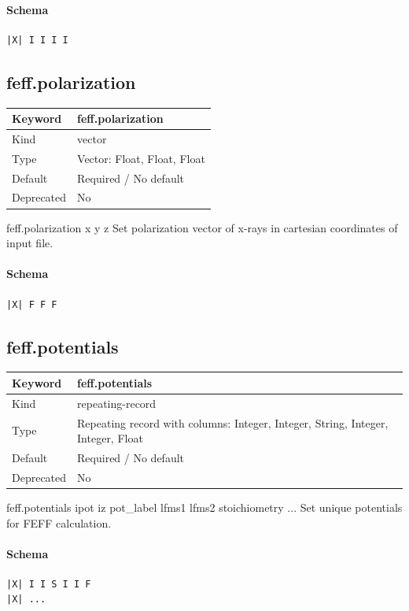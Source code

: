 \documentclass[11pt]{article}
\begin{document}
{{{{\paragraph{Schema}
\begin{Verbatim}
|X| I I I I
\end{Verbatim}

\subsection{feff.polarization}
\label{kw:feff-polarization}
\begin{longtable}{|p{1.5in}|p{4.5in}|}
\hline
Keyword & feff.polarization \\
\hline
Kind & vector \\
\hline
Type & Vector: Float, Float, Float \\
\hline
Default & Required / No default \\
\hline
Deprecated & No \\
\hline
\end{longtable}
 feff.polarization{ x y z }
 Set polarization vector of x-rays in cartesian coordinates of input file.

\paragraph{Schema}
\begin{Verbatim}
|X| F F F
\end{Verbatim}

\subsection{feff.potentials}
\label{kw:feff-potentials}
\begin{longtable}{|p{1.5in}|p{4.5in}|}
\hline
Keyword & feff.potentials \\
\hline
Kind & repeating-record \\
\hline
Type & Repeating record with columns: Integer, Integer, String, Integer, Integer, Float \\
\hline
Default & Required / No default \\
\hline
Deprecated & No \\
\hline
\end{longtable}
 feff.potentials{
   ipot iz pot\_label lfms1 lfms2 stoichiometry
   ...
 }
 Set unique potentials for FEFF calculation.


\paragraph{Schema}
\begin{Verbatim}
|X| I I S I I F
|X| ...
\end{Verbatim}

}}}}
\end{document}
